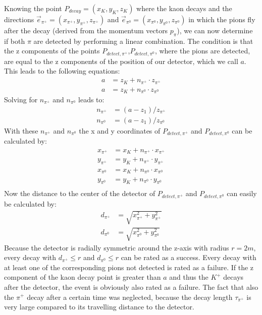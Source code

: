 \documentclass[a4paper,parskip,11pt, DIV12]{scrreprt}
\begin{document}
	Knowing the point $P_{decay}=(x_K,y_K,z_K)$  where the kaon decays and the directions $\vec{e}_{\pi^+}=(x_{\pi^+},y_{\pi^+},z_{\pi^+})$ and $\vec{e}_{\pi^0}=(x_{\pi^0},y_{\pi^0},z_{\pi^0})$ in which the pions fly after the decay (derived from the momentum vectors $p_{\pi}$), we can now determine if both $\pi$ are detected by performing a linear combination. The condition is that the z components of the points $P_{detect,\pi^+}$,$P_{detect,\pi^0}$, where the pions are detected, are equal to the z components of the position of our detector, which we call $a$. This leads to the following equations:
	\begin{align*}
	a &= z_K + n_{\pi^+} \cdot z_{\pi^+} \\ 
	a &= z_K + n_{\pi^0} \cdot z_{\pi^0}
	\end{align*} 
	Solving for $n_{\pi^+}$ and  $n_{\pi^0}$ leads to: 
	\begin{align*}
	n_{\pi^+} &= (a-z_1)/z_{\pi^+}\\
	n_{\pi^0} &= (a-z_1)/z_{\pi^0}
	\end{align*}
	With these $n_{\pi^+}$ and $n_{\pi^0}$ the x and y coordinates of $P_{detect,\pi^+}$ and $P_{detect,\pi^0}$ can be calculated by:
	\begin{align*}
	x_{\pi^+} &= x_K+n_{\pi^+} \cdot x_{\pi^+}\\
	y_{\pi^+} &= y_K+n_{\pi^+} \cdot y_{\pi^+}\\
	x_{\pi^0} &= x_K+n_{\pi^0} \cdot x_{\pi^0}\\
	y_{\pi^0} &= y_K+n_{\pi^0} \cdot y_{\pi^0}\\
	\end{align*}
	Now the distance to the center of the detector of $P_{detect,\pi^+}$ and $P_{detect,\pi^0}$ can easily be calculated by:
	\begin{align*}
	d_{\pi^+} &= \sqrt{x_{\pi^+}^2 + y_{\pi^+}^2}\\
	d_{\pi^0} &= \sqrt{x_{\pi^0}^2 +  y_{\pi^0}^2} 
	\end{align*}
	Because the detector is radially symmetric around the z-axis with radius $r=2m$, every decay with $d_{\pi^+} \leq r$ and $d_{\pi^0} \leq r$ can be rated as a success. Every decay with at least one of the corresponding pions not detected is rated as a failure. 
	If the z component of the kaon decay point is greater than $a$ and thus the $K^+$ decays after the detector, the event is obviously also rated as a failure. The fact that also the $\pi^+$ decay after a certain time was neglected, because the decay length $\tau_{\pi^+}$ is very large compared to its travelling distance to the detector.
	
\end{document}
